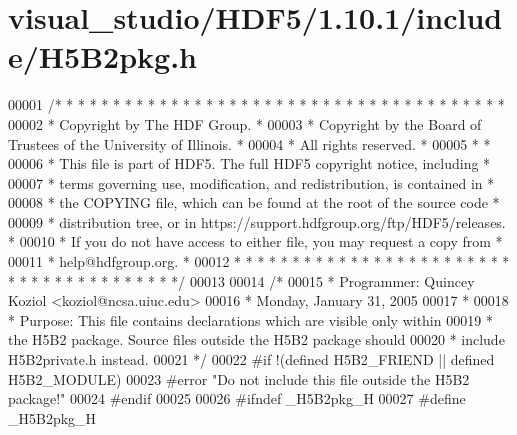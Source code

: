 \hypertarget{visual__studio_2_h_d_f5_21_810_81_2include_2_h5_b2pkg_8h_source}{}\section{visual\+\_\+studio/\+H\+D\+F5/1.10.1/include/\+H5\+B2pkg.h}
\label{visual__studio_2_h_d_f5_21_810_81_2include_2_h5_b2pkg_8h_source}

\begin{DoxyCode}
00001 \textcolor{comment}{/* * * * * * * * * * * * * * * * * * * * * * * * * * * * * * * * * * * * * * *}
00002 \textcolor{comment}{ * Copyright by The HDF Group.                                               *}
00003 \textcolor{comment}{ * Copyright by the Board of Trustees of the University of Illinois.         *}
00004 \textcolor{comment}{ * All rights reserved.                                                      *}
00005 \textcolor{comment}{ *                                                                           *}
00006 \textcolor{comment}{ * This file is part of HDF5.  The full HDF5 copyright notice, including     *}
00007 \textcolor{comment}{ * terms governing use, modification, and redistribution, is contained in    *}
00008 \textcolor{comment}{ * the COPYING file, which can be found at the root of the source code       *}
00009 \textcolor{comment}{ * distribution tree, or in https://support.hdfgroup.org/ftp/HDF5/releases.  *}
00010 \textcolor{comment}{ * If you do not have access to either file, you may request a copy from     *}
00011 \textcolor{comment}{ * help@hdfgroup.org.                                                        *}
00012 \textcolor{comment}{ * * * * * * * * * * * * * * * * * * * * * * * * * * * * * * * * * * * * * * */}
00013 
00014 \textcolor{comment}{/*}
00015 \textcolor{comment}{ * Programmer:  Quincey Koziol <koziol@ncsa.uiuc.edu>}
00016 \textcolor{comment}{ *      Monday, January 31, 2005}
00017 \textcolor{comment}{ *}
00018 \textcolor{comment}{ * Purpose: This file contains declarations which are visible only within}
00019 \textcolor{comment}{ *      the H5B2 package.  Source files outside the H5B2 package should}
00020 \textcolor{comment}{ *      include H5B2private.h instead.}
00021 \textcolor{comment}{ */}
00022 \textcolor{preprocessor}{#if !(defined H5B2\_FRIEND || defined H5B2\_MODULE)}
00023 \textcolor{preprocessor}{#error "Do not include this file outside the H5B2 package!"}
00024 \textcolor{preprocessor}{#endif}
00025 
00026 \textcolor{preprocessor}{#ifndef \_H5B2pkg\_H}
00027 \textcolor{preprocessor}{#define \_H5B2pkg\_H}

\end{DoxyCode}
